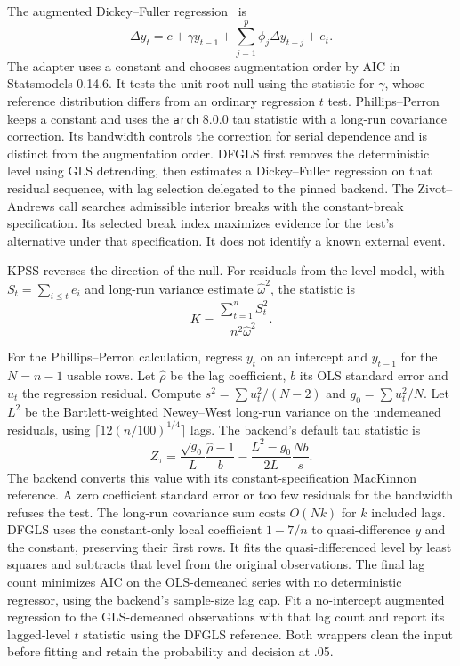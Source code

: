 The augmented Dickey--Fuller regression~\cite{adf} is
\begin{equation}
 \Delta y_t=c+\gamma y_{t-1}+\sum_{j=1}^{p}\phi_j\Delta y_{t-j}+e_t .
\end{equation}
The adapter uses a constant and chooses augmentation order by AIC in Statsmodels 0.14.6. It tests the unit-root null using the statistic for $\gamma$, whose reference distribution differs from an ordinary regression $t$ test. Phillips--Perron keeps a constant and uses the \texttt{arch} 8.0.0 tau statistic with a long-run covariance correction. Its bandwidth controls the correction for serial dependence and is distinct from the augmentation order. DFGLS first removes the deterministic level using GLS detrending, then estimates a Dickey--Fuller regression on that residual sequence, with lag selection delegated to the pinned backend. The Zivot--Andrews call searches admissible interior breaks with the constant-break specification. Its selected break index maximizes evidence for the test's alternative under that specification. It does not identify a known external event.

KPSS reverses the direction of the null. For residuals from the level model, with $S_t=\sum_{i\le t}e_i$ and long-run variance estimate $\widehat\omega^2$, the statistic is
\begin{equation}
 K=\frac{\sum_{t=1}^{n}S_t^2}{n^2\widehat\omega^2}.
\end{equation}

For the Phillips--Perron calculation, regress $y_t$ on an intercept and
$y_{t-1}$ for the $N=n-1$ usable rows. Let $\widehat\rho$ be the lag
coefficient, $b$ its OLS standard error and $u_t$ the regression residual.
Compute $s^2=\sum u_t^2/(N-2)$ and $g_0=\sum u_t^2/N$. Let $L^2$ be the
Bartlett-weighted Newey--West long-run variance on the undemeaned residuals,
using $\lceil 12(n/100)^{1/4}\rceil$ lags. The backend's default tau statistic is
\begin{equation}
 Z_\tau=\frac{\sqrt{g_0}}{L}\frac{\widehat\rho-1}{b}
       -\frac{L^2-g_0}{2L}\frac{Nb}{s}.
\end{equation}
The backend converts this value with its constant-specification MacKinnon
reference. A zero coefficient standard error or too few residuals for the
bandwidth refuses the test. The long-run covariance sum costs $O(Nk)$ for $k$
included lags. DFGLS uses the constant-only local coefficient $1-7/n$ to
quasi-difference $y$ and the constant, preserving their first rows. It fits
the quasi-differenced level by least squares and subtracts that level from
the original observations. The final lag count minimizes AIC on the
OLS-demeaned series with no deterministic regressor, using the backend's
sample-size lag cap. Fit a no-intercept augmented regression to the
GLS-demeaned observations with that lag count and report its lagged-level
$t$ statistic using the DFGLS reference. Both wrappers clean the input
before fitting and retain the probability and decision at .05.

